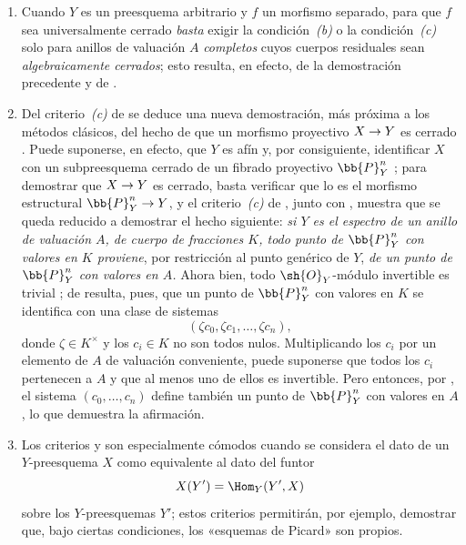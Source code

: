 \documentclass[oneside,10pt]{amsart}
\makeatletter
\newcommand{\ega@arrow}[2]{\mathchoice{#1}{#2}{#2}{#2}}
\renewcommand{\to}{\ega@arrow{\longrightarrow}{\rightarrow}}
\newcommand{\oldpage}[2][]{\marginnote{\normalfont\footnotesize\textbf{#1}~|~#2}\ignorespaces}
\let\EGAOriginalLabel\label
\renewcommand{\label}[1]{\phantomsection\EGAOriginalLabel{#1}}
\makeatother
\begin{document}

\begin{remarks}[7.3.9]
\label{II.7.3.9}
\begin{enumerate}
  \item[\rm{(i)}] Cuando $Y$ es un preesquema arbitrario y $f$ un morfismo separado, para que $f$ sea universalmente cerrado \emph{basta} exigir la condición~\emph{(b)} o la condición~\emph{(c)} solo para anillos de valuación $A$ \emph{completos} cuyos cuerpos residuales sean \emph{algebraicamente cerrados};
  esto resulta, en efecto, de la demostración precedente y de .

  \item[\rm{(ii)}] Del criterio~\emph{(c)} de  se deduce una nueva demostración, más próxima a los métodos clásicos, del hecho de que un morfismo proyectivo $X\to Y$ es cerrado .
  Puede suponerse, en efecto, que $Y$ es afín y, por consiguiente, identificar $X$ con un subpreesquema cerrado de un fibrado proyectivo $\bb{P}_Y^n$ ;
  para demostrar que $X\to Y$ es cerrado, basta verificar que lo es el morfismo estructural $\bb{P}_Y^n\to Y$, y el criterio~\emph{(c)} de , junto con , muestra que se queda reducido a demostrar el hecho siguiente:
  \emph{si $Y$ es el espectro de un anillo de valuación $A$, de cuerpo de fracciones $K$, todo punto de $\bb{P}_Y^n$ con valores en $K$ proviene}, por restricción al punto genérico de $Y$, \emph{de un punto de $\bb{P}_Y^n$ con valores en $A$.}
  Ahora bien, todo $\sh{O}_Y$-módulo invertible es trivial ;
  de  resulta, pues, que un punto de $\bb{P}_Y^n$ con valores en $K$ se identifica con una clase de sistemas
  \[
    (\zeta c_0,\zeta c_1,\ldots,\zeta c_n),
  \]
  donde $\zeta\in K^\times$ y los $c_i\in K$ no son todos nulos.
  Multiplicando los $c_i$ por un elemento de $A$ de
\oldpage[II]{146}
  valuación conveniente, puede suponerse que todos los $c_i$ pertenecen a $A$ y que al menos uno de ellos es invertible.
  Pero entonces, por , el sistema $(c_0,\ldots,c_n)$ define también un punto de $\bb{P}_Y^n$ con valores en $A$, lo que demuestra la afirmación.

  \item[\rm{(iii)}] Los criterios  y  son especialmente cómodos cuando se considera el dato de un $Y$-preesquema $X$ como equivalente al dato del funtor
  \[
    X(Y')=\Hom_Y(Y',X)
  \]
  sobre los $Y$-preesquemas $Y'$;
  estos criterios permitirán, por ejemplo, demostrar que, bajo ciertas condiciones, los «esquemas de Picard» son propios.
\end{enumerate}
\end{remarks}
\end{document}
